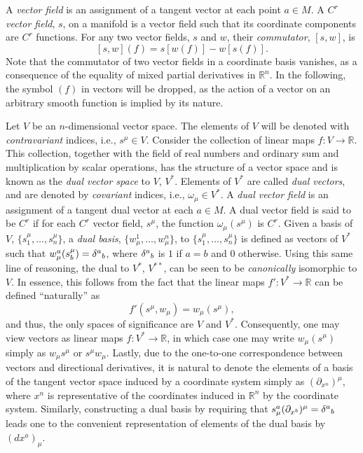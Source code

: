 \documentclass[
12pt,		%
openright,	%
twoside,  %
a4paper,			%
chapter=TITLE,		%
english,			%
french,				%
spanish,			%
brazil				%
]{USPSC-classe/USPSC}
\begin{document}
\begin{apendicesenv}
A \textit{vector field} is an assignment of a tangent vector at each point $a\in M$. A \textit{$C^r$ vector field}, $s$, on a manifold is a vector field such that its coordinate  components are $C^r$ functions. For any two vector fields, $s$ and $w$, their \textit{commutator}, $[s,w]$, is 
\begin{equation}\label{aeq11}
    [s,w](f)=s[w(f)]-w[s(f)].
\end{equation}
Note that the commutator of two vector fields in a coordinate basis vanishes, as a consequence of the equality of mixed partial derivatives in $\mathbb{R}^n$. In the following, the symbol $(f)$ in vectors will be dropped, as the action of a vector on an arbitrary smooth function is implied by its nature.

Let $V$ be an $n$-dimensional vector space. The elements of $V$ will be denoted with \textit{contravariant} indices, i.e., $s^{\mu}\in V$. Consider the collection of linear maps $f:V\to\mathbb{R}$. This collection, together with the field of real numbers and ordinary sum and multiplication by scalar operations, has the structure of a vector space and is known as the \textit{dual vector space} to $V$, $V^*$. Elements of $V^*$ are called \textit{dual vectors}, and are denoted by \textit{covariant} indices, i.e., $\omega_{\mu}\in V^*$. A \textit{dual vector field} is an assignment of a tangent dual vector at each $a \in M$. A dual vector field is said to be $C^r$ if for each $C^r$ vector field, $s^{\mu}$, the function $\omega_{\mu}(s^{\mu})$ is $C^r$. Given a basis of $V$, $\{s_1^{\mu},\ldots,s_n^{\mu}\}$, a \textit{dual basis}, $\{w^1_{\mu},\ldots,w^n_{\mu}\}$, to $\{s_1^{\mu},\ldots,s_n^{\mu}\}$ is defined as vectors of $V^*$ such that $w^{a}_{\mu}(s_{b}^{\mu})=\delta^{a}\mathstrut_{b}$, where $\delta^{a}\mathstrut_{b}$ is $1$ if $a=b$ and $0$ otherwise. Using this same line of reasoning, the dual to $V^*$, $V^{**}$, can be seen to be \textit{canonically} isomorphic to $V$. In essence, this follows from the fact that the linear maps $f':V^*\to\mathbb{R}$ can be defined ``naturally'' as 
\begin{equation}
    f'(s^{\mu},w_{\mu})=w_{\mu}(s^{\mu}),
\end{equation}
and thus, the only spaces of significance are $V$ and $V^*$. Consequently, one may view vectors as linear maps $f:V^*\to\mathbb{R}$, in which case one may write $w_{\mu}(s^{\mu})$ simply as $w_{\mu}s^{\mu}$ or $s^{\mu}w_{\mu}$. Lastly, due to the one-to-one correspondence between vectors and directional derivatives, it is natural to denote the elements of a basis of the tangent vector space induced by a coordinate system simply as $(\partial_{x^{n}})^{\mu}$, where $x^{n}$ is representative of the coordinates induced in $\mathbb{R}^n$ by the coordinate system. Similarly, constructing a dual basis by requiring that $s_{\mu}^a(\partial_{x^{b}})^{\mu}=\delta^{a}\mathstrut_{b}$ leads one to the convenient representation of elements of the dual basis by $(d{x^{a}})_{\mu}$.


\end{apendicesenv}
\end{document}
